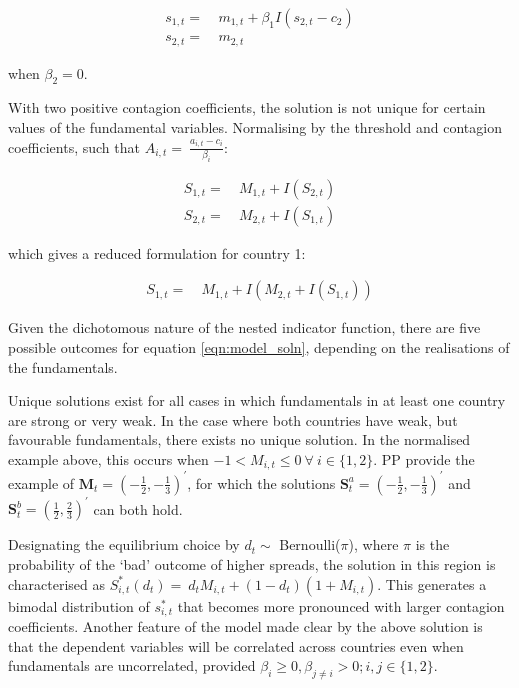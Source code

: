 \documentclass[../base.tex]{subfiles}
\begin{document}
\begin{align*}
	s_{1,t} =&~ m_{1,t} + \beta_1 I(s_{2,t} - c_2) \\
	s_{2,t} =&~ m_{2,t}
\end{align*}

when $\beta_2 = 0$. 

With two positive contagion coefficients, the solution is not unique for certain values of the fundamental variables. Normalising by the threshold and contagion coefficients, such that $A_{i,t} =~\frac{a_{i,t} - c_i}{\beta_i}$:

\begin{align*}
	S_{1,t} =&~ M_{1,t} + I(S_{2,t})\\
	S_{2,t} =&~ M_{2,t} + I(S_{1,t})
\end{align*}

which gives a reduced formulation for country 1:

\begin{align}
	S_{1,t} =&~ M_{1,t} + I(M_{2,t} + I(S_{1,t}))
	\label{eqn:model_soln}
\end{align}

Given the dichotomous nature of the nested indicator function, there are five possible outcomes for equation \ref{eqn:model_soln}, depending on the realisations of the fundamentals. 

Unique solutions exist for all cases in which fundamentals in at least one country are strong or very weak. In the case where both countries have weak, but favourable fundamentals, there exists no unique solution. In the normalised example above, this occurs when $-1 < M_{i,t} \leq 0~\forall~i \in \{1,2\}$. PP provide the example of $\mathbf{M}_t = (-\frac{1}{2}, -\frac{1}{3})^\prime$, for which the solutions $\mathbf{S}_t^a = (-\frac{1}{2}, -\frac{1}{3})^\prime$ and $\mathbf{S}_t^b = (\frac{1}{2}, \frac{2}{3})^\prime$ can both hold.

Designating the equilibrium choice by $d_t \sim$ Bernoulli($\pi$), where $\pi$ is the probability of the `bad' outcome of higher spreads, the solution in this region is characterised as $S_{i,t}^*(d_t) =~d_tM_{i,t} + (1 - d_t)(1 + M_{i,t})$. This generates a bimodal distribution of $s_{i,t}^*$ that becomes more pronounced with larger contagion coefficients. Another feature of the model made clear by the above solution is that the dependent variables will be correlated across countries even when fundamentals are uncorrelated, provided $\beta_i \geq 0, \beta_{j \neq i} > 0; i,j \in \{1, 2\}$. 
\end{document}
